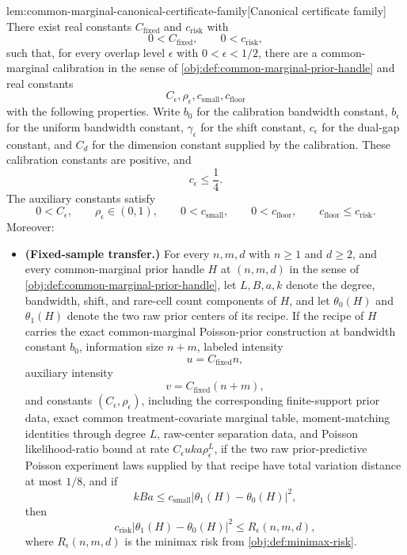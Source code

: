 \begin{lemmav}{lem:common-marginal-canonical-certificate-family}[Canonical certificate family]
There exist real constants \(C_{\mathrm{fixed}}\) and \(c_{\mathrm{risk}}\) with
\[
0<C_{\mathrm{fixed}},
\qquad
0<c_{\mathrm{risk}},
\]
such that, for every overlap level \(\epsilon\) with \(0<\epsilon<1/2\), there are a common-marginal calibration in the sense of \cref{obj:def:common-marginal-prior-handle} and real constants
\[
C_\epsilon,\rho_\epsilon,c_{\mathrm{small}},c_{\mathrm{floor}}
\]
with the following properties.  Write \(b_0\) for the calibration bandwidth constant, \(b_\epsilon\) for the uniform bandwidth constant, \(\gamma_\epsilon\) for the shift constant, \(c_\epsilon\) for the dual-gap constant, and \(C_d\) for the dimension constant supplied by the calibration.  These calibration constants are positive, and
\[
c_\epsilon\le \frac14 .
\]
The auxiliary constants satisfy
\[
0<C_\epsilon,
\qquad
\rho_\epsilon\in(0,1),
\qquad
0<c_{\mathrm{small}},
\qquad
0<c_{\mathrm{floor}},
\qquad
c_{\mathrm{floor}}\le c_{\mathrm{risk}} .
\]
Moreover:
\begin{itemize}
\item \textbf{(Fixed-sample transfer.)}
For every \(n,m,d\) with \(n\ge1\) and \(d\ge2\), and every common-marginal prior handle \(H\) at \((n,m,d)\) in the sense of \cref{obj:def:common-marginal-prior-handle}, let \(L,B,a,k\) denote the degree, bandwidth, shift, and rare-cell count components of \(H\), and let \(\theta_0(H)\) and \(\theta_1(H)\) denote the two raw prior centers of its recipe.  If the recipe of \(H\) carries the exact common-marginal Poisson-prior construction at bandwidth constant \(b_0\), information size \(n+m\), labeled intensity
\[
u=C_{\mathrm{fixed}}n,
\]
auxiliary intensity
\[
v=C_{\mathrm{fixed}}(n+m),
\]
and constants \((C_\epsilon,\rho_\epsilon)\), including the corresponding finite-support prior data, exact common treatment-covariate marginal table, moment-matching identities through degree \(L\), raw-center separation data, and Poisson likelihood-ratio bound at rate \(C_\epsilon u k a\rho_\epsilon^L\), if the two raw prior-predictive Poisson experiment laws supplied by that recipe have total variation distance at most \(1/8\), and if
\[
kBa
\le
c_{\mathrm{small}}
\left|\theta_1(H)-\theta_0(H)\right|^2,
\]
then
\[
c_{\mathrm{risk}}
\left|\theta_1(H)-\theta_0(H)\right|^2
\le
R_\epsilon(n,m,d),
\]
where \(R_\epsilon(n,m,d)\) is the minimax risk from \cref{obj:def:minimax-risk}.


\end{itemize}
\end{lemmav}
